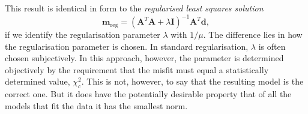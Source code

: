 \documentclass[a4paper,10pt]{paper}
\begin{document}
\begin{enumerate}
\begin{enumerate}
    This result is identical in form to the \emph{regularised least squares solution}
    \begin{equation*}
        \mathbf{m}_{\mathrm{reg}}=(\mathbf{A}^{T}\mathbf{A}+\lambda \mathbf{I})^{-1}\mathbf{A}^{T}\mathbf{d},
    \end{equation*}
    if we identify the regularisation parameter $\lambda$ with $1/\mu$. The difference lies in how the regularisation parameter is chosen. In standard regularisation, $\lambda$ is often chosen subjectively. In this approach, however, the
     parameter is determined objectively by the requirement that the misfit must equal a statistically determined value, $\chi_{c}^{2}$. This is not, however, to say that the resulting model is the correct one. But it does have
     the potentially desirable property that of all the models that fit the data it has the smallest norm.
\end{enumerate}





\end{enumerate}
\end{document}
